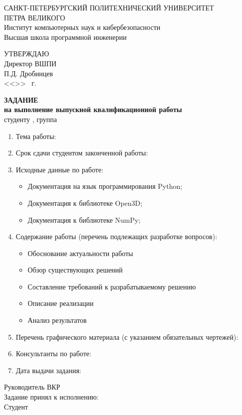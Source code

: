\begin{center}
  {САНКТ-ПЕТЕРБУРГСКИЙ ПОЛИТЕХНИЧЕСКИЙ УНИВЕРСИТЕТ\\ ПЕТРА ВЕЛИКОГО} \\
  {Институт компьютерных наук и кибербезопасности} \\
  {Высшая школа программной инженерии} \\

  {
  \begin{flushright}
    УТВЕРЖДАЮ\\
    Директор ВШПИ\\
    \underline{\hspace{2.2cm}} П.Д. Дробинцев\\
    <<\underline{\hspace*{0.05\textheight}}>> \underline{\hspace*{0.1\textheight}} \the\year{}~г. \\[1.8cm]
  \end{flushright}
  }

  \textbf{ЗАДАНИЕ} \\
  \textbf{на выполнение выпускной квалификационной работы}\\
  студенту \AuthorFull, группа \Group \\[0.5cm]
  \begin{enumerate}[label=\arabic*.]
    \item Тема работы: \Theme
    \item Срок сдачи студентом законченной работы: \TaskDeadline
    \item Исходные данные по работе:
      \begin{itemize}
        \item Документация на язык программирования Python;
        \item Документация к библиотеке Open3D;
        \item Документация к библиотеке NumPy;
      \end{itemize}
    \item Содержание работы (перечень подлежащих разработке вопросов):
      \begin{itemize}
        \item Обоснование актуальности работы
        \item Обзор существующих решений
        \item Составление требований к разрабатываемому решению
        \item Описание реализации
        \item Анализ результатов
      \end{itemize}
    \item Перечень графического материала (с указанием обязательных чертежей):
    \item Консультанты по работе:
    \item Дата выдачи задания: \TaskCreatedCiframi
  \end{enumerate}
\end{center}
Руководитель ВКР \hspace{3.5cm} \underline{\hspace{5cm}} \hfill \Supervisor\\[0.5cm]
Задание принял к исполнению: \TaskCreatedCiframi\\[0.5cm]
Студент \hspace{5.8cm} \underline{\hspace{5cm}} \hfill \Author\\
